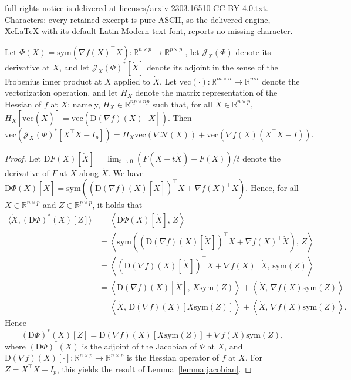 \documentclass[10pt,a4paper]{amsart}
\newcommand{\Jacob}[2]{\mathcal{J}_{#2}\left(#1\right)}
\newcommand{\bR}{\mathbb{R}}    %
\newcommand{\cN}{\mathcal{N}} %
\newcommand{\inner}[2]{\left\langle#1,\,#2\right\rangle} %
\newcommand{\sym}{{\mathrm{sym}}}
\newcommand{\vectHess}[1]{H_{#1}} %
\newcommand{\vect}[1]{\mathrm{vec}\left(#1\right)}
\begin{document}
full rights notice is delivered at licenses/arxiv-2303.16510-CC-BY-4.0.txt. Characters: every retained excerpt is pure ASCII, so the delivered engine, XeLaTeX with its default Latin Modern text font, reports no missing character.
\begin{lemma} \label{lemma:jacobian}
    Let $\Phi(X) = \sym(\nabla f(X)^{\top} X) :\bR^{n\times p} \rightarrow \bR^{p\times p}$ , 
    let $\Jacob{\Phi}{X}$ denote its derivative at $X$, and let $\Jacob{\Phi}{X}^*[\dot{X}]$ denote its adjoint in the sense of the Frobenius inner product at $X$ applied to $\dot{X}$. Let $\vect{\cdot}:\bR^{m \times n} \rightarrow \bR^{mn}$ denote the vectorization operation, and let $\vectHess{X}$ denote the matrix representation of the Hessian of $f$ at $X$; namely, $\vectHess{X} \in \mathbb{R}^{np\times np}$ such that, for all $\dot{X}\in\mathbb{R}^{n\times p}$, $\vectHess{X}[\vect{\dot{X}}] = \vect{\mathrm{D}(\nabla f)(X)[\dot{X}]}$. Then 
    \begin{equation*}
        \vect{\Jacob{\Phi}{X}^* [X^{\top}X - I_p]} = \vectHess{X} \vect{\nabla \cN (X)} + \vect{\nabla f(X)(X^{\top}X - I)}.
    \end{equation*}
\end{lemma}

\begin{proof}
    Let $\mathrm{D}F(X)[\dot{X}] = \lim_{t\to0} (F(X+t\dot{X})-F(X))/t$ denote the derivative of $F$ at $X$ along $\dot{X}$. We have $\mathrm{D}\Phi(X)[\dot{X}] = \sym(\left(\mathrm{D}(\nabla f)(X)[\dot{X}]\right)^{\top} X + \nabla f(X)^{\top} \dot{X})$. Hence, for all $\dot{X}\in\mathbb{R}^{n\times p}$ and $Z\in \mathbb{R}^{p\times p}$,
    it holds that 
    \begin{align}
        \langle \dot{X}, (\mathrm{D}\Phi)^*(X)[Z]\rangle 
        &= \inner{\mathrm{D}\Phi(X)[\dot{X}]}{Z} \\
        &= \inner{\sym(\left(\mathrm{D}(\nabla f)(X)[\dot{X}]\right)^{\top} X + \nabla f(X)^{\top} \dot{X})}{Z}\\
        &= \inner{\left(\mathrm{D}(\nabla f)(X)[\dot{X}]\right)^{\top} X + \nabla f(X)^{\top} \dot{X}}{\sym(Z)}\\
        &=\inner{\mathrm{D}(\nabla f)(X)[\dot{X}]}{ X\sym(Z)} + \inner{ \dot{X}}{\nabla f(X)\sym(Z)}\\
        &= \inner{\dot{X}}{\mathrm{D}(\nabla f)(X)[X\sym(Z)]} + \inner{\dot{X}}{\nabla f(X)\sym(Z)}.
    \end{align}
    Hence 
    \[
    (\mathrm{D}\Phi)^*(X)[Z] = \mathrm{D}(\nabla f)(X)[X\sym(Z)] + \nabla f(X)\sym(Z),
    \]
    where $(\mathrm{D}\Phi)^*(X)$ is the adjoint of the Jacobian of $\Phi$ at $X$, and $\mathrm{D}(\nabla f)(X)[\cdot]: \mathbb{R}^{n\times p} \to \mathbb{R}^{n\times p}$ is the Hessian operator of $f$ at $X$. For $Z = X^{\top} X-I_p$, this yields the result of Lemma~\ref{lemma:jacobian}.
\end{proof}
\end{document}
